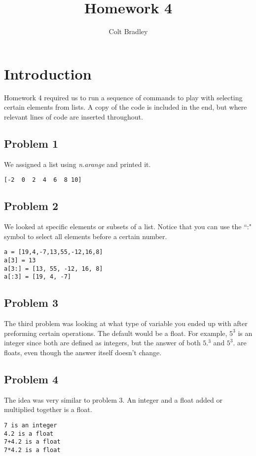 \documentclass[11pt]{article}
\begin{document}
\title{Homework 4}
\author{Colt Bradley}
\date{}
\maketitle

\section{Introduction}
Homework 4 required us to run a sequence of commands to play with selecting certain elements from lists. A copy of the code is included in the end, but where relevant lines of code are inserted throughout.

\subsection{Problem 1}
We assigned a list using \emph{n.arange} and printed it. 
\begin{verbatim}
[-2  0  2  4  6  8 10]
\end{verbatim}

\subsection{Problem 2}
We looked at specific elements or subsets of a list. Notice that you can use the ``:" symbol to select all elements before a certain number. 
\begin{verbatim}
a = [19,4,-7,13,55,-12,16,8]
a[3] = 13
a[3:] = [13, 55, -12, 16, 8]
a[:3] = [19, 4, -7]
\end{verbatim}

\subsection{Problem 3}
The third problem was looking at what type of variable you ended up with after preforming certain operations. The default would be a float. For example, $5^3$ is an integer since both are defined as integers, but the answer of both $5.^3$ and $5^3.$ are floats, even though the answer itself doesn't change. 

\subsection{Problem 4}
The idea was very similar to problem 3. An integer and a float added or multiplied together is a float. 
\begin{verbatim}
7 is an integer
4.2 is a float
7+4.2 is a float
7*4.2 is a float
\end{verbatim}
\end{document}
